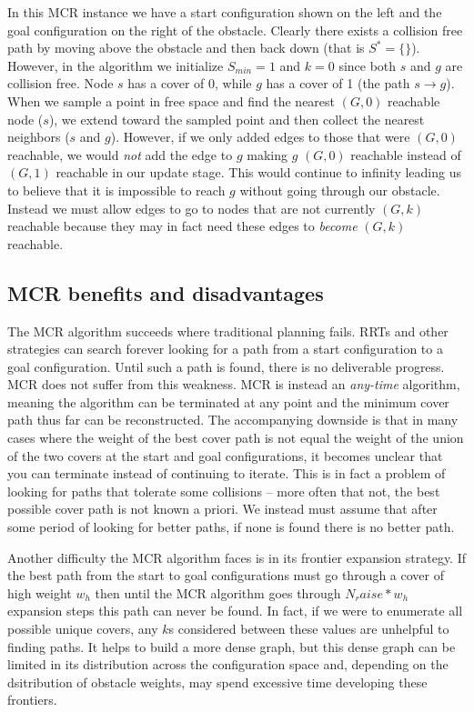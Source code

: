 In this MCR instance we have a start configuration shown on the left and the goal configuration on the right of the obstacle. Clearly there exists a collision free path by moving above the obstacle and then back down (that is $S^{*} = \{\}$). However, in the algorithm we initialize $S_{min} = 1$ and $k=0$ since both $s$ and $g$ are collision free. Node $s$ has a cover of 0, while $g$ has a cover of 1 (the path $s \rightarrow g$). When we sample a point in free space and find the nearest $(G,0)$ reachable node ($s$), we extend toward the sampled point and then collect the nearest neighbors ($s$ and $g$). However, if we only added edges to those that were $(G,0)$ reachable, we would \emph{not} add the edge to $g$ making $g$ $(G,0)$ reachable instead of $(G,1)$ reachable in our update stage. This would continue to infinity leading us to believe that it is impossible to reach $g$ without going through our obstacle. Instead we must allow edges to go to nodes that are not currently $(G,k)$ reachable because they may in fact need these edges to \emph{become} $(G,k)$ reachable.

\subsection{MCR benefits and disadvantages}
The MCR algorithm succeeds where traditional planning fails. RRTs and other strategies can search forever looking for a path from a start configuration to a goal configuration. Until such a path is found, there is no deliverable progress. MCR does not suffer from this weakness. MCR is instead an \emph{any-time} algorithm, meaning the algorithm can be terminated at any point and the minimum cover path thus far can be reconstructed. The accompanying downside is that in many cases where the weight of the best cover path is not equal the weight of the union of the two covers at the start and goal configurations, it becomes unclear that you can terminate instead of continuing to iterate. This is in fact a problem of looking for paths that tolerate some collisions -- more often that not, the best possible cover path is not known a priori. We instead must assume that after some period of looking for better paths, if none is found there is no better path.

Another difficulty the MCR algorithm faces is in its frontier expansion strategy. If the best path from the start to goal configurations must go through a cover of high weight $w_h$ then until the MCR algorithm goes through $N_raise * w_h$ expansion steps this path can never be found. In fact, if we were to enumerate all possible unique covers, any $k$s considered between these values are unhelpful to finding paths. It helps to build a more dense graph, but this dense graph can be limited in its distribution across the configuration space and, depending on the dsitribution of obstacle weights, may spend excessive time developing these frontiers.


